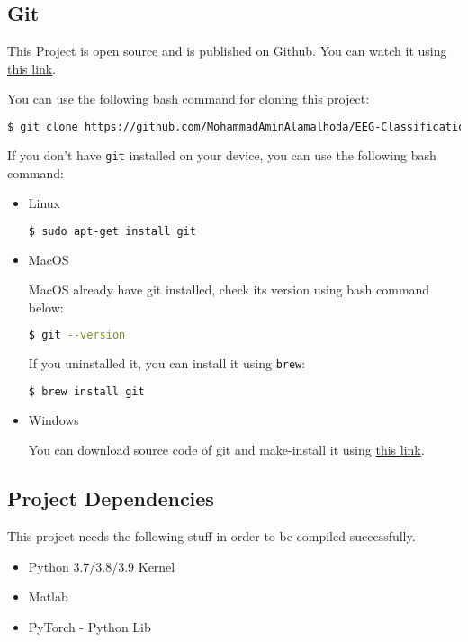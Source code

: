 \documentclass[a4paper, openany]{book}
\newcommand{\code}{\texttt}
\begin{document}
\subsection{Git}
	\vspace{0.3cm}

This Project is open source and is published on Github. You can watch it using \href{https://github.com/MohammadAminAlamalhoda/EEG-Classification}{this link}.

You can use the following bash command for cloning this project:

\begin{lstlisting}[language=bash]
  $ git clone https://github.com/MohammadAminAlamalhoda/EEG-Classification
    \end{lstlisting}
  
If you don't have \code{git} installed on your device, you can use the following bash command:
\begin{itemize}
\item Linux
\begin{lstlisting}[language=bash]
  $ sudo apt-get install git
  \end{lstlisting}
  
\item MacOS

MacOS already have git installed, check its version using bash command below:

\begin{lstlisting}[language=bash]
  $ git --version
  \end{lstlisting}
If you uninstalled it, you can install it using \code{brew}:
\begin{lstlisting}[language=bash]
  $ brew install git
  \end{lstlisting}
\item Windows

You can download source code of git and make-install it using \href{https://git-scm.com/download/win}{this link}.
\end{itemize}



\subsection{Project Dependencies}
	\vspace{0.3cm}

This project needs the following stuff in order to be compiled successfully.

\begin{itemize}
\item  Python 3.7/3.8/3.9 Kernel
\item Matlab
\item PyTorch - Python Lib

\end{itemize}
\end{document}
